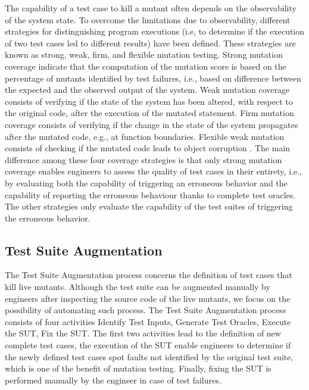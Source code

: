 The capability of a test case to kill a mutant often depends on the observability of the system state. 
To overcome the limitations due to observability, different strategies for distinguishing program executions (i.e, to determine if the execution of two test cases led to different results) have been defined. These strategies are known as strong, weak, firm, and flexible mutation testing.
Strong mutation coverage indicate that the computation of the mutation score is based on the percentage of mutants identified by test failures, i.e., based on difference between the expected and the observed output of the system.  Weak mutation coverage consists of verifying if the state of the system has been altered, with respect to the original code, after the execution of the mutated statement. Firm mutation coverage consists of verifying if the change in the state of the system propagates after the mutated code, e.g., at function boundaries. Flexible weak mutation consists of checking if the mutated code leads to object corruption \cite{mateo2012validating}. The main difference among these four coverage strategies is that only strong mutation coverage enables engineers to assess the quality of test cases in their entirety, i.e., by evaluating both the capability of triggering an erroneous behavior and the capability of reporting the erroneous behaviour thanks to complete test oracles. The other strategies only evaluate the capability of the test suites of triggering the erroneous behavior. 


\subsection{Test Suite Augmentation} %
\label{sub:test_suite_augmentation}

The Test Suite Augmentation process concerns the definition of test cases that kill live mutants. Although the test suite can be augmented manually by engineers after inspecting the source code of the live mutants, we focus on the possibility of automating such process. 
The Test Suite Augmentation process consists of four activities Identify Test Inputs, Generate Test Oracles, Execute the SUT, Fix the SUT. The first two activities lead to the definition of new complete test cases, the execution of the SUT enable engineers to determine if the newly defined test cases spot faults not identified  by the original test suite, which is one of the benefit of mutation testing. Finally, fixing the SUT is performed manually by the engineer in case of test failures.


